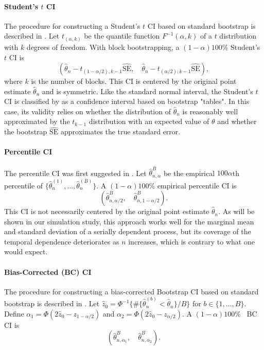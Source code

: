 \documentclass[10pt]{article}
\newcommand{\eds}[1]{\textcolor{red}{EDS: (#1)}}
\newcommand{\mc}[1]{\textcolor{orange}{MC: (#1)}}
\begin{document}
\paragraph{Student's $t$ CI}
The procedure for constructing a Student's $t$ CI based on standard bootstrap is 
described in \citet{efron1993introduction}. Let $t_{(\alpha, k)}$ be the 
quantile function $F^{-1}(\alpha, k)$ of a $t$ distribution with $k$ degrees of 
freedom. With 
block bootstrapping, 
a $(1 - \alpha)100\%$ Student's $t$ CI is
\[
(\hat{\theta}_{n} - t_{(1-\alpha/2), k - 1}\widehat{\text{SE}}, \quad
\hat{\theta}_{n} - t_{(\alpha/2), k -1}\widehat{\text{SE}}),
\]
where $k$ is the number of blocks. This CI is centered by the original point 
estimate $\hat\theta_n$ and is symmetric. Like the standard normal interval, the
Student's $t$ CI is classified by \citet{efron1993introduction} 
as a confidence interval based on bootstrap "tables". In this case, its 
validity relies on whether the distribution of $\hat\theta_n$ is reasonably well 
approximated by the $t_{k-1}$ distribution with an expected value of $\theta$ 
and whether the bootstrap $\widehat{\text{SE}}$ approximates the true standard 
error.


\paragraph{Percentile CI}
The percentile CI was first suggested in \citet{efron1979bootstrap}.
Let $\hat\theta_{n, \alpha}^B$ be the empirical $100\alpha$th percentile of
$\{\hat\theta_n^{(1)}, \ldots, \hat\theta_n^{(B)}\}$. 
A $(1 - \alpha)100\%$ empirical percentile CI is
\[
(\hat\theta_{n, \alpha/2}^{B}, \quad \hat\theta_{n, 1 - \alpha/2}^{B}).
\]
This CI is not necessarily centered by the original point estimate 
$\hat\theta_n$. As will be shown in our simulation study, this approach works 
well for the marginal mean and standard deviation of a serially dependent 
process, but its coverage of the temporal dependence deteriorates as $n$ 
increases, which is contrary to what one would expect.


\paragraph{Bias-Corrected (BC) CI}
The procedure for constructing a bias-corrected Bootstrap CI based on standard
bootstrap is described in \citet{carpenter2000bootstrap}. Let
$\hat{z}_0 = \Phi^{-1}\{\#\{\hat\theta_n^{(b)} < \hat{\theta}_n\} / B\}$ for
$b \in \{1, \ldots, B\}$. Define 
$\alpha_1 = \Phi(2\hat{z}_0 - z_{1 - \alpha/2})$ 
and $\alpha_2 = \Phi(2\hat{z}_0 - z_{\alpha/2})$. 
A $(1 - \alpha)100\%$ ~BC CI is
\[
(\hat\theta_{n, \alpha_1}^{B}, \quad \hat\theta_{n, \alpha_2}^{B}).
\]
\end{document}
